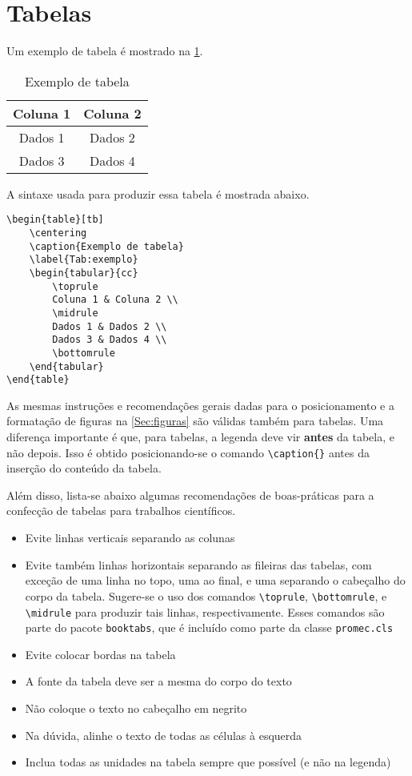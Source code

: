 \section{Tabelas}
Um exemplo de tabela é mostrado na \cref{Tab:exemplo}.
\begin{table}[tb]
    \centering
    \caption{Exemplo de tabela}
    \label{Tab:exemplo}
    \begin{tabular}{cc}
        \toprule
        Coluna 1 & Coluna 2 \\
        \midrule
        Dados 1 & Dados 2 \\
        Dados 3 & Dados 4 \\
        \bottomrule
    \end{tabular}
\end{table}
A sintaxe usada para produzir essa tabela é mostrada abaixo.
\begin{lstlisting}
\begin{table}[tb]
    \centering
    \caption{Exemplo de tabela}
    \label{Tab:exemplo}
    \begin{tabular}{cc}
        \toprule
        Coluna 1 & Coluna 2 \\
        \midrule
        Dados 1 & Dados 2 \\
        Dados 3 & Dados 4 \\
        \bottomrule
    \end{tabular}
\end{table}
\end{lstlisting}

As mesmas instruções e recomendações gerais dadas para o posicionamento e a formatação de figuras na \cref{Sec:figuras} são válidas também para tabelas. Uma diferença importante é que, para tabelas, a legenda deve vir \textbf{antes} da tabela, e não depois. Isso é obtido posicionando-se o comando \lstinline!\caption{}! antes da inserção do conteúdo da tabela.

Além disso, lista-se abaixo algumas recomendações de boas-práticas para a confecção de tabelas para trabalhos científicos.
\begin{itemize}
    \item Evite linhas verticais separando as colunas
    \item Evite também linhas horizontais separando as fileiras das tabelas, com exceção de uma linha no topo, uma ao final, e uma separando o cabeçalho do corpo da tabela. Sugere-se o uso dos comandos \lstinline!\toprule!, \lstinline!\bottomrule!, e \lstinline!\midrule! para produzir tais linhas, respectivamente. Esses comandos são parte do pacote \lstinline!booktabs!, que é incluído como parte da classe \texttt{promec.cls}
    \item Evite colocar bordas na tabela
    \item A fonte da tabela deve ser a mesma do corpo do texto
    \item Não coloque o texto no cabeçalho em negrito
    \item Na dúvida, alinhe o texto de todas as células à esquerda
    \item Inclua todas as unidades na tabela sempre que possível (e não na legenda)
\end{itemize}

